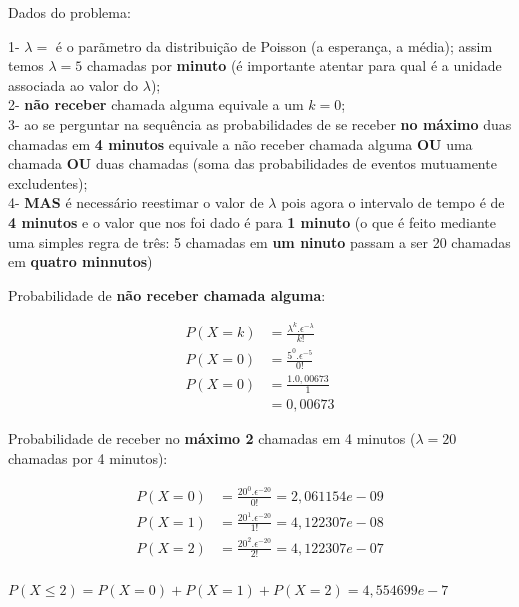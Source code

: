 \documentclass[
]{book}
\begin{document}
\hfill\break

Dados do problema:

1- \(\lambda=\) é o parãmetro da distribuição de Poisson (a esperança, a média); assim temos \(\lambda=5\) chamadas por \textbf{minuto} (é importante atentar para qual é a unidade associada ao valor do \(\lambda\));\\
2- \textbf{não receber} chamada alguma equivale a um \(k=0\);\\
3- ao se perguntar na sequência as probabilidades de se receber \textbf{no máximo} duas chamadas em \textbf{4 minutos} equivale a não receber chamada alguma \textbf{OU} uma chamada \textbf{OU} duas chamadas (soma das probabilidades de eventos mutuamente excludentes);\\
4- \textbf{MAS} é necessário reestimar o valor de \(\lambda\) pois agora o intervalo de tempo é de \textbf{4 minutos} e o valor que nos foi dado é para \textbf{1 minuto} (o que é feito mediante uma simples regra de três: 5 chamadas em \textbf{um ninuto} passam a ser 20 chamadas em \textbf{quatro minnutos})

\hfill\break

Probabilidade de \textbf{não receber chamada alguma}:

\hfill\break

\begin{align*}
P(X=k) & = \frac{\lambda ^{k}. \epsilon^{-\lambda}} {k!} \\
P(X=0) & = \frac{5^{0}. \epsilon^{-5}} {0!} \\
P(X=0) & = \frac{1 . 0,00673}{1}\\
       & = 0,00673
\end{align*}

\hfill\break

Probabilidade de receber no \textbf{máximo 2} chamadas em 4 minutos (\(\lambda = 20\) chamadas por 4 minutos):

\hfill\break

\begin{align*}
P(X=0) & = \frac{20^{0}. \epsilon^{-20}} {0!} = 2,061154e-09 \\
P(X=1) & = \frac{20^{1}. \epsilon^{-20}} {1!} = 4,122307e-08 \\
P(X=2) & = \frac{20^{2}. \epsilon^{-20}} {2!} = 4,122307e-07 \\
\end{align*}

\(P(X \le 2)=P(X=0)+P(X=1)+P(X=2)=4,554699e-7\)

\hfill\break
\end{document}
